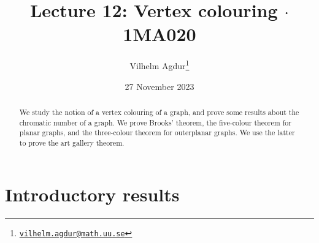 \documentclass[nobib]{tufte-handout}
\title{Lecture 12: Vertex colouring $\cdot$ 1MA020}
\author[Vilhelm Agdur]{Vilhelm Agdur\thanks{\href{mailto:vilhelm.agdur@math.uu.se}{\nolinkurl{vilhelm.agdur@math.uu.se}}}}
\date{27 November 2023}
\begin{document}
    

\maketitle%

\begin{abstract}
\noindent
We study the notion of a vertex colouring of a graph, and prove some results about the chromatic number of a graph. We prove Brooks' theorem, the five-colour theorem for planar graphs, and the three-colour theorem for outerplanar graphs. We use the latter to prove the art gallery theorem.
\end{abstract}

\section{Introductory results}
\end{document}
